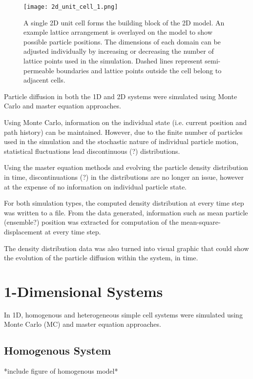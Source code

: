 \begin{figure}[h]
	\centering
	\texttt{[image: 2d\_unit\_cell\_1.png]}
	\caption{A single 2D unit cell forms the building block of the 2D model. An example lattice arrangement is overlayed on the model to show possible particle positions. The dimensions of each domain can be adjusted individually by increasing or decreasing the number of lattice points used in the simulation. Dashed lines represent semi-permeable boundaries and lattice points outside the cell belong to adjacent cells.}
	\label{fig:2d_unit_cell_1.png}
\end{figure}

Particle diffusion in both the 1D and 2D systems were simulated using Monte Carlo and master equation approaches. 

Using Monte Carlo, information on the individual state (i.e. current position and path history) can be maintained. However, due to the finite number of particles used in the simulation and the stochastic nature of individual particle motion, statistical fluctuations lead discontinuous (?) distributions.

Using the master equation methods and evolving the particle density distribution in time, discontinuations (?) in the distributions are no longer an issue, however at the expense of no information on individual particle state.

For both simulation types, the computed density distribution at every time step was written to a file. From the data generated, information such as mean particle (ensemble?) position was extracted for computation of the mean-square-displacement at every time step.

The density distribution data was also turned into visual graphic that could show the evolution of the particle diffusion within the system, in time.

\section{1-Dimensional Systems}
In 1D, homogenous and heterogeneous simple cell systems were simulated using Monte Carlo (MC) and master equation approaches. 



\subsection{Homogenous System}


*include figure of homogenous model*


